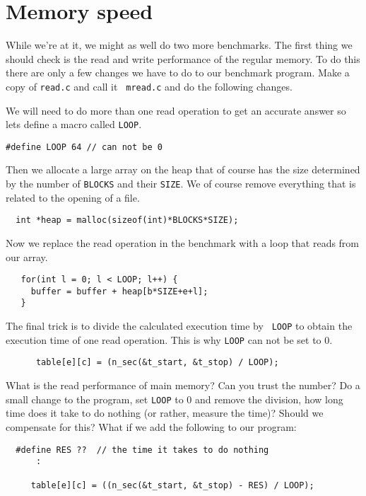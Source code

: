 \documentclass[a4paper,11pt]{article}
\begin{document}
\section{Memory speed}

While we're at it, we might as well do two more benchmarks. The first
thing we should check is the read and write performance of the regular
memory. To do this there are only a few changes we have to do to our
benchmark program. Make a copy of {\tt read.c} and call it {\tt
  mread.c} and do the following changes.

We will need to do more than one read operation to get an accurate
answer so lets define a macro called {\tt LOOP}. 

\begin{lstlisting}
#define LOOP 64 // can not be 0
\end{lstlisting}

Then we allocate a large array on the heap that of course has the size
determined by the number of {\tt BLOCKS} and their {\tt SIZE}. We
of course remove everything that is related to the opening of a file.

\begin{lstlisting}
  int *heap = malloc(sizeof(int)*BLOCKS*SIZE);
\end{lstlisting}

Now we replace the read operation in the benchmark with a loop that
reads from our array.

\begin{lstlisting}
   for(int l = 0; l < LOOP; l++) {
     buffer = buffer + heap[b*SIZE+e+l];
   }
\end{lstlisting}

The final trick is to divide the calculated execution time by {\tt
  LOOP} to obtain the execution time of one read operation. This is
why {\tt LOOP} can not be set to 0.

\begin{lstlisting}
      table[e][c] = (n_sec(&t_start, &t_stop) / LOOP);
\end{lstlisting}

What is the read performance of main memory? Can you trust the number?
Do a small change to the program, set {\tt LOOP} to 0 and remove the
division, how long time does it take to do nothing (or rather, measure
the time)? Should we compensate for this? What if we add the following
to our program:

\begin{lstlisting}
  #define RES ??  // the time it takes to do nothing
      :

     table[e][c] = ((n_sec(&t_start, &t_stop) - RES) / LOOP);      
\end{lstlisting}
\end{document}
